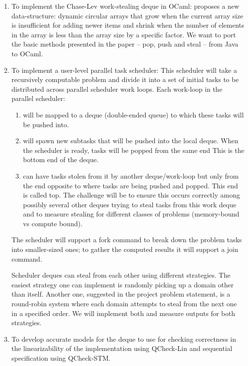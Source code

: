 \documentclass[11pt,a4paper]{article}
\begin{document}
\begin{enumerate}
    \item To implement the Chase-Lev work-stealing deque in OCaml: \cite{chase2005dynamic}
     proposes a new data-structure: dynamic circular arrays that grow when
     the current array size is insufficient for adding newer items and shrink
     when the number of elements in the array is less than the array size by a
     specific factor. We want to port the basic methods presented in the paper
     -- pop, push and steal -- from Java to OCaml.

   \item To implement a user-level parallel task scheduler: This
    scheduler will take a recursively computable problem and divide it into
    a set of initial tasks to be distributed across parallel scheduler work loops.
    Each work-loop in the parallel scheduler:
    \begin{enumerate}
        \item will be mapped to a deque (double-ended queue) to which these tasks
            will be pushed into.
        \item will spawn new subtasks that will be pushed into the local deque.
            When the scheduler is ready, tasks will be popped from the same end
            This is the bottom end of the deque.
        \item can have tasks stolen from it by another deque/work-loop but only
            from the end opposite to where tasks are being pushed and popped.
            This end is called top. The challenge will be to ensure this occurs
            correctly among possibly several other deques trying to steal tasks
            from this work deque and to measure stealing for different classes of
            problems (memory-bound vs compute bound).
     \end{enumerate}
     The scheduler will support a fork command to break down the problem tasks
     into smaller-sized ones; to gather the computed results it will support
     a join command.

     Scheduler deques can steal from each other using different
     strategies. The easiest strategy one can implement is randomly picking up
     a domain other than itself. Another one, suggested in the project problem
     statement, is a round-robin system where each domain attempts to steal
     from the next one in a specified order. We will implement both and measure
     outputs for both strategies.

   \item To develop accurate models for the deque to use for checking correctness
       in the linearizability of the implementation using QCheck-Lin and
       sequential specification using QCheck-STM.


\end{enumerate}
\end{document}
